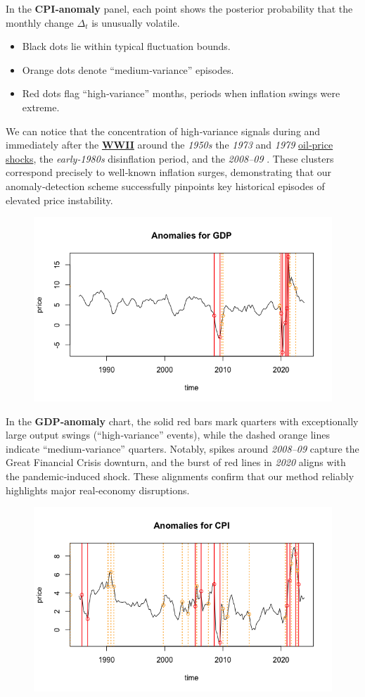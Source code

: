 \documentclass{Configuration_Files/PoliMi3i_thesis}
\begin{document}
In the \textbf{CPI‐anomaly} panel, each point shows the posterior probability that the monthly change \(\Delta_t\) is unusually volatile.
\begin{itemize}
    \item Black dots lie within typical fluctuation bounds.
    \item Orange dots denote “medium‐variance” episodes.
    \item Red dots flag “high‐variance” months, periods when inflation swings were extreme.
\end{itemize}
We can notice that the concentration of high‐variance signals during and immediately after the \href{https://scholar.harvard.edu/files/stock/files/whyhasinflationbecomeharderforecast.pdf}{\textbf{WWII}} around the \textit{1950s} the \textit{1973} and \textit{1979} \href{https://www.chicagofed.org/publications/chicago-fed-letter/1994/october-86?utm_source}{oil‐price shocks}, the \textit{early‐1980s} disinflation period, and the \textit{2008–09} .  These clusters correspond precisely to well‐known inflation surges, demonstrating that our anomaly‐detection scheme successfully pinpoints key historical episodes of elevated price instability.
\begin{figure}[H]
    \centering
    \includegraphics[width=0.75\linewidth]{Anomal_GDP.png}
\end{figure}
In the \textbf{GDP‐anomaly} chart, the solid red bars mark quarters with exceptionally large output swings (“high‐variance” events), while the dashed orange lines indicate “medium‐variance” quarters. Notably, spikes around \textit{2008–09} capture the Great Financial Crisis downturn, and the burst of red lines in \textit{2020} aligns with the pandemic‐induced shock. These alignments confirm that our method reliably highlights major real‐economy disruptions.
\begin{figure}[H]
    \centering
    \includegraphics[width=0.75\linewidth]{Anomalis_CPI.png}
\end{figure}
\end{document}
